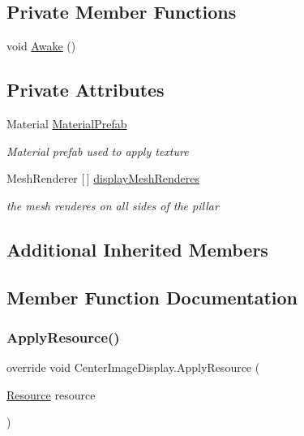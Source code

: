 \subsection*{Private Member Functions}
\begin{DoxyCompactItemize}
\item 
void \mbox{\hyperlink{class_center_image_display_a413c4767daa6cca041577ba63eb3b8d5}{Awake}} ()
\end{DoxyCompactItemize}
\subsection*{Private Attributes}
\begin{DoxyCompactItemize}
\item 
Material \mbox{\hyperlink{class_center_image_display_af22091d70f8772c7263ad852e3770619}{Material\+Prefab}}
\begin{DoxyCompactList}\small\item\em Material prefab used to apply texture \end{DoxyCompactList}\item 
Mesh\+Renderer \mbox{[}$\,$\mbox{]} \mbox{\hyperlink{class_center_image_display_a47f09ee02109c10416288b5022f193f8}{display\+Mesh\+Renderes}}
\begin{DoxyCompactList}\small\item\em the mesh renderes on all sides of the pillar \end{DoxyCompactList}\end{DoxyCompactItemize}
\subsection*{Additional Inherited Members}


\subsection{Member Function Documentation}
\mbox{\label{class_center_image_display_aca1aaf14b20d538cafb0c7731b8be2bb}} 
\subsubsection{\texorpdfstring{Apply\+Resource()}{ApplyResource()}}
{\footnotesize\ttfamily override void Center\+Image\+Display.\+Apply\+Resource (\begin{DoxyParamCaption}\item[{\mbox{\hyperlink{class_resource}{Resource}}}]{resource }\end{DoxyParamCaption})\hspace{0.3cm}{\ttfamily [virtual]}}



